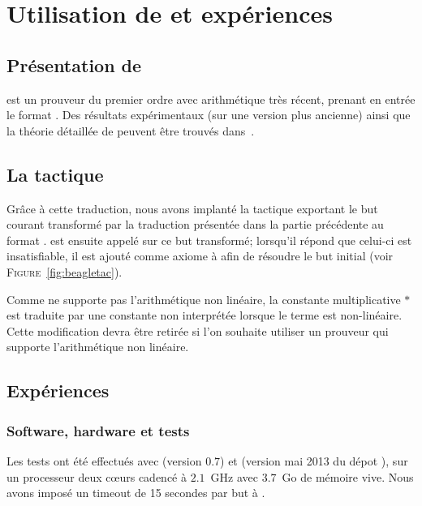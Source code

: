 \section{Utilisation de \beagle et expériences}
\label{sec:experiences}

\subsection{Présentation de \beagle}
\beagle est un prouveur du premier ordre avec arithmétique très récent,
prenant en entrée le format \tff. Des résultats expérimentaux (sur une
version plus ancienne) ainsi que la théorie détaillée de \beagle peuvent être trouvés dans~\cite{DBLP:conf/cade/BaumgartnerW13}.


\subsection{La tactique \beagletac}
\label{sec:experiences:beagletac}

Grâce à cette traduction, nous avons implanté la tactique \beagletac
exportant le but courant transformé par la traduction présentée dans la
partie précédente au format \tff. \beagle est ensuite appelé sur ce but
transformé; lorsqu'il répond que celui-ci est insatisfiable, il est
ajouté comme axiome à \holfour afin de résoudre le but initial (voir
\textsc{Figure}~\ref{fig:beagletac}).

Comme \beagle ne supporte pas l'arithmétique non linéaire, la constante
multiplicative $*$ est traduite par une constante non interprétée
lorsque le terme est non-linéaire. Cette modification devra être retirée
si l'on souhaite utiliser un prouveur qui supporte l'arithmétique non
linéaire.


\subsection{Expériences}
\label{sec:experiences:experiences}

\subsubsection{Software, hardware et tests}
Les tests ont été effectués avec \beagle (version $0.7$) et \holfour (version mai 2013 du dépot ), sur un processeur deux cœurs cadencé à $2.1$~GHz avec $3.7$~Go de mémoire vive.
Nous avons imposé un timeout de 15 secondes par but à \beagle.

